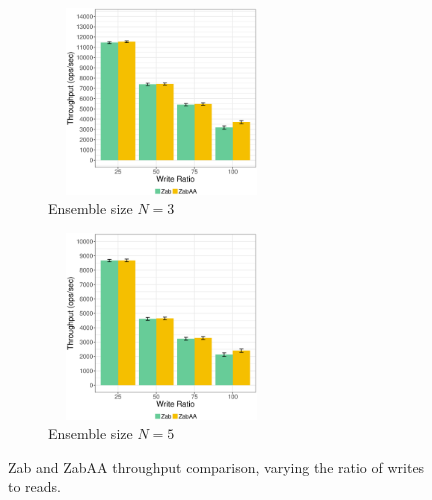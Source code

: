 \documentclass[a4paper,UKenglish]{oasics-v2016}
\begin{document}
\begin{figure}[h]
	\begin{subfigure}{.5\linewidth}
		\includegraphics[width=170pt,height=140pt, scale=0.39]{figuress/TN3_AA.eps}
		\caption{Ensemble size $N=3$}
		\label{ThroughputAAN3}
	\end{subfigure}		
	\begin{subfigure}{.5\linewidth}
		\includegraphics[width=170pt,height=140pt, scale=0.39]{figuress/TN5_AA.eps}
		\caption{Ensemble size $N=5$}
		\label{ThroughputAAN5}
	\end{subfigure}		
	\caption{Zab and ZabAA throughput comparison, varying the ratio of writes to reads.}
	\label{latency comparisonN5}
\end{figure}


\end{document}
